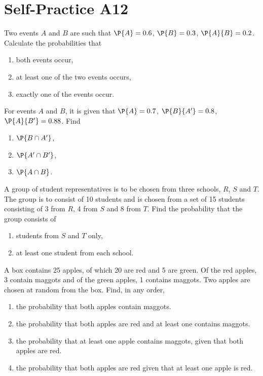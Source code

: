 \section{Self-Practice A12}

\begin{problem}
    Two events $A$ and $B$ are such that $\P{A} = 0.6$, $\P{B} = 0.3$, $\P{A}{B} = 0.2$. Calculate the probabilities that
    \begin{enumerate}
        \item both events occur,
        \item at least one of the two events occurs,
        \item exactly one of the events occur.
    \end{enumerate}
\end{problem}

\begin{problem}
    For events $A$ and $B$, it is given that $\P{A} = 0.7$, $\P{B}{A'} = 0.8$, $\P{A}{B'} = 0.88$. Find
    \begin{enumerate}
        \item $\P{B \cap A'}$,
        \item $\P{A' \cap B'}$,
        \item $\P{A \cap B}$.
    \end{enumerate}
\end{problem}

\begin{problem}
    A group of student representatives is to be chosen from three schools, $R$, $S$ and $T$. The group is to consist of 10 students and is chosen from a set of 15 students consisting of 3 from $R$, 4 from $S$ and 8 from $T$. Find the probability that the group consists of
    \begin{enumerate}
        \item students from $S$ and $T$ only,
        \item at least one student from each school.
    \end{enumerate}
\end{problem}

\begin{problem}
    A box contains 25 apples, of which 20 are red and 5 are green. Of the red apples, 3 contain maggots and of the green apples, 1 contains maggots. Two apples are chosen at random from the box. Find, in any order,
    \begin{enumerate}
        \item the probability that both apples contain maggots.
        \item the probability that both apples are red and at least one contains maggots.
        \item the probability that at least one apple contains maggots, given that both apples are red.
        \item the probability that both apples are red given that at least one apple is red.
    \end{enumerate}
\end{problem}

